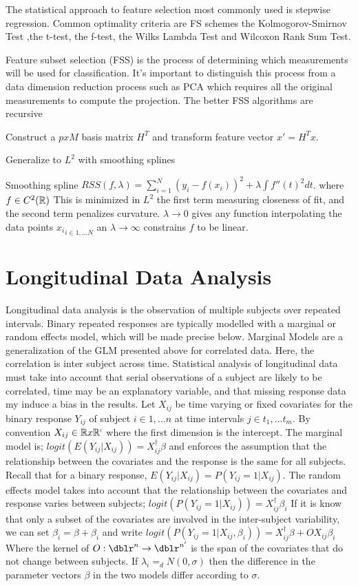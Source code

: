 The statistical approach to feature selection most commonly used is stepwise regression.  Common optimality criteria are FS schemes the Kolmogorov-Smirnov Test ,the t-test, the f-test, the Wilks Lambda Test and Wilcoxon Rank Sum Test.

Feature subset selection (FSS) is the process of determining which measurements will be used for classification.  It's important to distinguish this process from a data dimension reduction process such as PCA which requires all the original measurements to compute the projection. The better FSS algorithms are recursive

Construct a $p x M$ basis matrix $H^{T}$ and transform feature vector $x' = H^{T} x$.

Generalize to $L^{2}$ with smoothing splines

Smoothing spline $RSS(f,\lambda)= \sum\limits_{i=1}^{N} (y_{i} -f(x_{i}) )^{2} + \lambda \int f''(t)^{2} dt$. where $f \in C^{2}(\mathbb{R} )$ This is minimized in $L^{2}$ the first term measuring closeness of fit, and the second term penalizes curvature. $\lambda \rightarrow 0$ gives any function interpolating the data points ${x_i}_{i  \in {1, ... N} } $ an $\lambda \rightarrow \infty$ constrains $f$ to be linear.




\section{Longitudinal Data Analysis} Longitudinal data analysis is the observation of multiple subjects over repeated intervals. Binary repeated responses are typically modelled with a marginal or random effects model, which will be made precise below. Marginal Models are a generalization of the GLM presented above for correlated data.  Here, the correlation is inter subject across time.  Statistical analysis of longitudinal data must take into account that serial observations of a subject are likely to be correlated, time may be an explanatory variable, and that missing response data my induce a bias in the results.  Let ${X_{ij}}$ be time varying or fixed covariates for the binary response ${Y_{ij}}$ of subject $i \in {1,...n}$ at time intervals $j \in {t_1,...t_m}$. By convention $X_{ij} \in \mathbb{R} x \mathbb{R^p}$ where the first dimension is the intercept. The marginal model is; $logit (E(Y_{ij} | X_{ij}) ) = X_{ij}^{\dagger} \beta$ and enforces the assumption that the relationship between the covariates and the response is the same for all subjects. Recall that for a binary response, $E(Y_{ij} | X_{ij}) = P(Y_{ij}=1 | X_{ij})$.  The random effects model takes into account that the relationship between the covariates and response varies between subjects; $logit (P(Y_{ij}=1 | X_{ij}) ) = X_{ij}^{\dagger} \beta_i$ If it is know that only a subset of the covariates are involved in the inter-subject variability, we can set $\beta_i= \beta + \beta_i$ and write $logit (P(Y_{ij}=1 | X_{ij}, \beta_i) ) = X_{ij}^{\dagger} \beta + O X_{ij} \beta_i$ Where the kernel of $O : \dblr^n \rightarrow \dblr^{n'}$ is the span of the covariates that do not change between subjects.  If $\lambda_i =_d N(0,\sigma)$ then the difference in the parameter vectors $\beta$ in the two models differ according to $\sigma$.  

